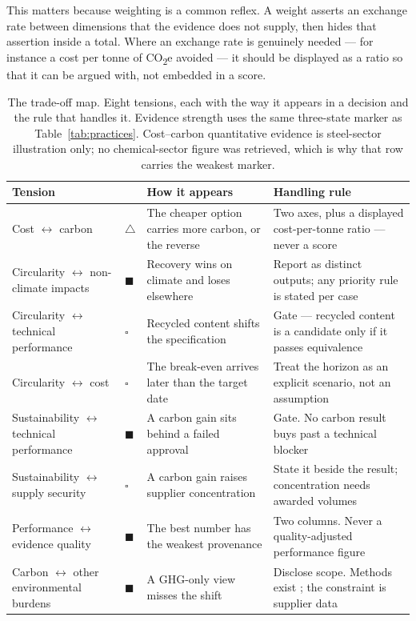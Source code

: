 \documentclass[10pt,twocolumn,a4paper]{article}
\newcommand{\co}{CO\textsubscript{2}e}
\newcommand{\dimhead}[1]{\textbf{#1}}
\begin{document}
This matters because weighting is a common reflex. A weight asserts an
exchange rate between dimensions that the evidence does not supply, then hides
that assertion inside a total. Where an exchange rate is genuinely needed --- for
instance a cost per tonne of \co{} avoided --- it should be displayed as a ratio
so that it can be argued with, not embedded in a score.

\begin{table}[t]
  \caption{The trade-off map. Eight tensions, each with the way it appears in a
  decision and the rule that handles it. Evidence strength uses the same
  three-state marker as Table~\ref{tab:practices}. Cost--carbon quantitative
  evidence is steel-sector illustration only; no chemical-sector figure was
  retrieved, which is why that row carries the weakest marker.}
  \label{tab:tradeoffs}
  \small
  \begin{tabular}{@{}p{}p{}p{}p{}@{}}
    \toprule
    \dimhead{Tension} & & \dimhead{How it appears} & \dimhead{Handling rule} \\
    \midrule
    Cost $\leftrightarrow$ carbon & $\triangle$ & The cheaper option carries more carbon, or the reverse & Two axes, plus a displayed cost-per-tonne ratio --- never a score \\
    Circularity $\leftrightarrow$ non-climate impacts & $\blacksquare$ & Recovery wins on climate and loses elsewhere & Report as distinct outputs; any priority rule is stated per case \\
    Circularity $\leftrightarrow$ technical performance & $\square$ & Recycled content shifts the specification & Gate --- recycled content is a candidate only if it passes equivalence \\
    Circularity $\leftrightarrow$ cost & $\square$ & The break-even arrives later than the target date & Treat the horizon as an explicit scenario, not an assumption \\
    Sustainability $\leftrightarrow$ technical performance & $\blacksquare$ & A carbon gain sits behind a failed approval & Gate. No carbon result buys past a technical blocker \\
    Sustainability $\leftrightarrow$ supply security & $\square$ & A carbon gain raises supplier concentration & State it beside the result; concentration needs awarded volumes \\
    Performance $\leftrightarrow$ evidence quality & $\blacksquare$ & The best number has the weakest provenance & Two columns. Never a quality-adjusted performance figure \\
    Carbon $\leftrightarrow$ other environmental burdens & $\blacksquare$ & A GHG-only view misses the shift & Disclose scope. Methods exist \cite{v3,v4}; the constraint is supplier data \\
    \bottomrule
  \end{tabular}
\end{table}
\end{document}
